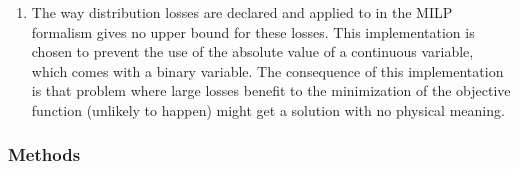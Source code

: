 \documentclass[letterpaper,10pt,english]{sphinxmanual}
\begin{document}
\begin{fulllineitems}
\begin{fulllineitems}
\begin{enumerate}
\item {} 
\sphinxAtStartPar
The way distribution losses are declared and applied to  in the MILP formalism gives no upper bound for
these losses. This implementation is chosen to prevent the use of the absolute value of a continuous variable,
which comes with a binary variable.
The consequence of this implementation is that problem where large losses benefit to the minimization of
the objective function (unlikely to happen) might get a solution with no physical meaning.

\end{enumerate}

\end{fulllineitems}

\subsubsection*{Methods}


\begin{savenotes}\sphinxattablestart
\centering
\begin{tabulary}{\linewidth}[t]{}
\hline


\end{tabulary}
\end{savenotes}
\end{fulllineitems}
\end{document}
